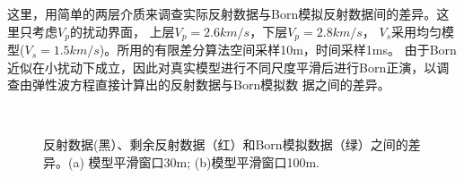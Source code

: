 这里，用简单的两层介质来调查实际反射数据与Born模拟反射数据间的差异。这里只考虑$V_p$的扰动界面，
上层$V_p=2.6km/s$，下层$V_p=2.8km/s$， $V_s$采用均匀模型($V_s=1.5km/s$)。所用的有限差分算法空间采样10m，时间采样1ms。
由于Born近似在小扰动下成立，因此对真实模型进行不同尺度平滑后进行Born正演，以调查由弹性波方程直接计算出的反射数据与Born模拟数
据之间的差异。
\begin{figure}[!htb]
   \centering
   \\
   \caption{反射数据(黑）、剩余反射数据（红）和Born模拟数据（绿）之间的差异。(a)
   模型平滑窗口30m; (b)模型平滑窗口100m.}
   \label{fig:refl_born_comparison}
\end{figure}
